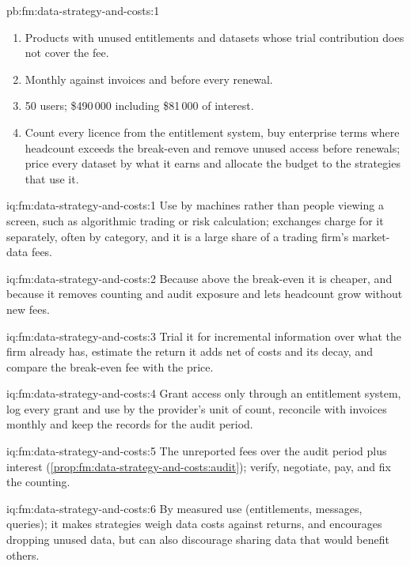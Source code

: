 \begin{solution}{pb:fm:data-strategy-and-costs:1}
\begin{enumerate}
\item Products with unused entitlements and datasets whose trial contribution does not cover the fee.
\item Monthly against invoices and before every renewal.
\item 50 users; \$490\,000 including \$81\,000 of interest.
\item Count every licence from the entitlement system, buy enterprise terms where headcount exceeds the break-even and remove unused access before
renewals; price every dataset by what it earns and allocate the budget to the strategies that use it.
\end{enumerate}
\end{solution}

\begin{solution}{iq:fm:data-strategy-and-costs:1}
Use by machines rather than people viewing a screen, such as algorithmic trading or risk calculation; exchanges charge for it separately, often
by category, and it is a large share of a trading firm's market-data fees.
\end{solution}

\begin{solution}{iq:fm:data-strategy-and-costs:2}
Because above the break-even it is cheaper, and because it removes counting and audit exposure and lets headcount grow without new fees.
\end{solution}

\begin{solution}{iq:fm:data-strategy-and-costs:3}
Trial it for incremental information over what the firm already has, estimate the return it adds net of costs and its decay, and compare the
break-even fee with the price.
\end{solution}

\begin{solution}{iq:fm:data-strategy-and-costs:4}
Grant access only through an entitlement system, log every grant and use by the provider's unit of count, reconcile with invoices monthly and keep
the records for the audit period.
\end{solution}

\begin{solution}{iq:fm:data-strategy-and-costs:5}
The unreported fees over the audit period plus interest (\cref{prop:fm:data-strategy-and-costs:audit}); verify, negotiate, pay, and fix the
counting.
\end{solution}

\begin{solution}{iq:fm:data-strategy-and-costs:6}
By measured use (entitlements, messages, queries); it makes strategies weigh data costs against returns, and encourages dropping unused data,
but can also discourage sharing data that would benefit others.
\end{solution}
